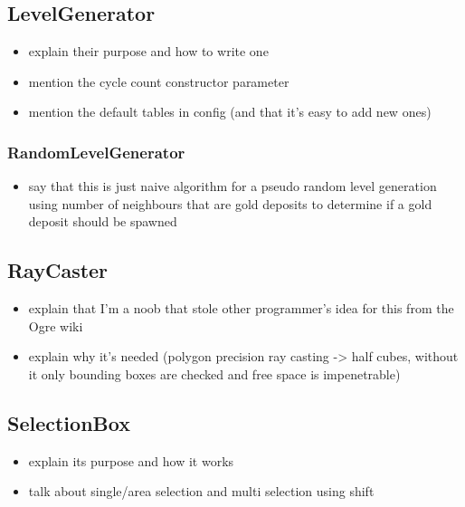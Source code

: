 \subsection{LevelGenerator}

\begin{itemize}
    \item explain their purpose and how to write one
    \item mention the cycle count constructor parameter
    \item mention the default tables in config (and that it's easy to add new ones)
\end{itemize}

\subsubsection{RandomLevelGenerator}

\begin{itemize}
    \item say that this is just naive algorithm for a pseudo random level generation
        using number of neighbours that are gold deposits to determine if a gold
        deposit should be spawned
\end{itemize}

\subsection{RayCaster}

\begin{itemize}
    \item explain that I'm a noob that stole other programmer's idea for this
        from the Ogre wiki
    \item explain why it's needed (polygon precision ray casting -> half cubes,
        without it only bounding boxes are checked and free space is impenetrable)
\end{itemize}

\subsection{SelectionBox}

\begin{itemize}
    \item explain its purpose and how it works
    \item talk about single/area selection and multi selection using shift
\end{itemize}

